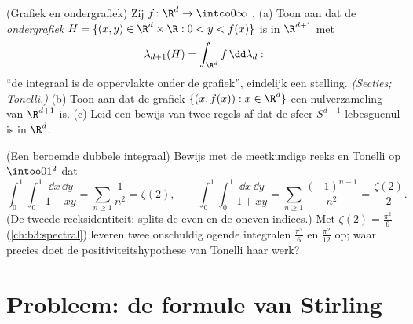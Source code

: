 \begin{exercise}[$\star\star$]\label{exo:b3:product:11}
(Grafiek en ondergrafiek) Zij $f \colon \R^d \to \intco0\infty$
.
(a) Toon aan dat de \emph{ondergrafiek} $H = \{(x, y) \in
\R^d\times\R : 0 < y < f(x)\}$  is in $\R^{d+1}$ met
\[
\lambda_{d+1}(H) = \int_{\R^d}f\,\dd\lambda_d :
\]
``de integraal is de oppervlakte onder de grafiek'', eindelijk een
stelling. \emph{(Secties; Tonelli.)}
(b) Toon aan dat de grafiek $\{(x, f(x)) : x \in \R^d\}$ een
nulverzameling van $\R^{d+1}$ is.
(c) Leid een bewijs van twee regels af dat de sfeer $S^{d-1}$
lebesguenul is in $\R^d$.
\end{exercise}

\begin{exercise}[$\star\star$]\label{exo:b3:product:12}
(Een beroemde dubbele integraal) Bewijs met de meetkundige reeks
en Tonelli op $\intoo01^2$ dat
\[
\int_0^1\!\!\int_0^1\frac{\dd x\,\dd y}{1 - xy}
= \sum_{n\geq1}\frac1{n^2} = \zeta(2),
\qquad
\int_0^1\!\!\int_0^1\frac{\dd x\,\dd y}{1 + xy}
= \sum_{n\geq1}\frac{(-1)^{n-1}}{n^2} = \frac{\zeta(2)}2 .
\]
(De tweede reeksidentiteit: splits de even en de oneven indices.)
Met $\zeta(2) = \frac{\pi^2}6$ (\cref{ch:b3:spectral}) leveren
twee onschuldig ogende integralen $\frac{\pi^2}6$ en
$\frac{\pi^2}{12}$ op; waar precies doet de positiviteitshypothese
van Tonelli haar werk?
\end{exercise}

\section{Probleem: de formule van Stirling}

